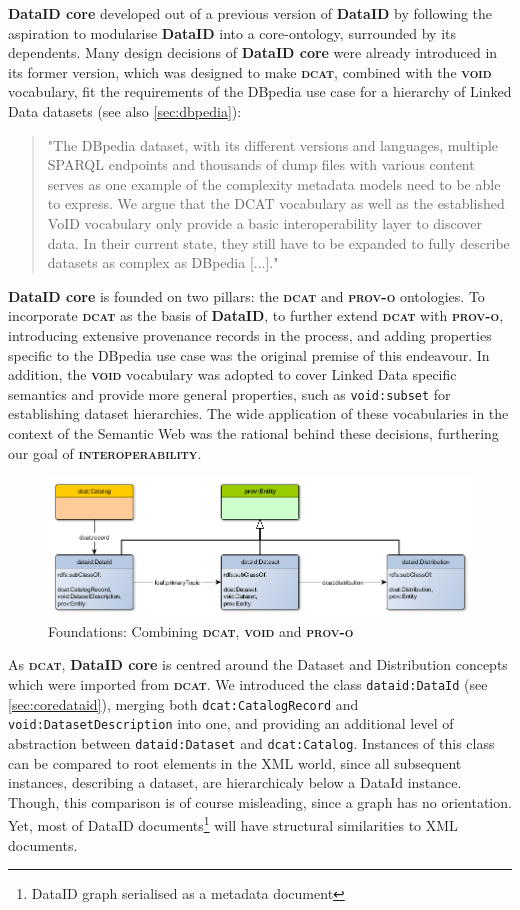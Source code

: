\documentclass[a4paper,english,twoside,BCOR1.5cm,headsepline,DIV12,appendixprefix,final,12pt]{scrbook}
\newcommand{\interoperability}{{\ttfamily\scshape\bfseries interoperability}\xspace}
\newcommand{\dataid}{{\ttfamily\bfseries DataID}\xspace}
\newcommand{\core}{{\ttfamily\bfseries DataID core}\xspace}
\newcommand{\prov}{{\scshape\bfseries prov-o}\xspace}
\newcommand{\void}{{\scshape\bfseries void}\xspace}
\newcommand{\dcat}{{\scshape\bfseries dcat}\xspace}
\newcommand{\prop}[1]{{{\texttt{#1}}}}
\begin{document}
\core developed out of a previous version of \dataid by following the aspiration to modularise \dataid into a core-ontology, surrounded by its dependents. Many design decisions of \core were already introduced in its former version, which was designed to make \dcat, combined with the \void vocabulary, fit the requirements of the DBpedia use case for a hierarchy of Linked Data datasets (see also \cref{sec:dbpedia}):

\begin{quote}
"The DBpedia dataset, with
its different versions and languages, multiple SPARQL endpoints
and thousands of dump files with various content
serves as one example of the complexity metadata models
need to be able to express. We argue that the DCAT vocabulary
as well as the established VoID vocabulary only
provide a basic interoperability layer to discover data. In
their current state, they still have to be expanded to fully
describe datasets as complex as DBpedia [...]." \cite{dataID2014} 
\end{quote}

\core is founded on two pillars: the \dcat and \prov ontologies. To incorporate \dcat as the basis of \dataid, to further extend \dcat with \prov, introducing extensive provenance records in the process, and adding properties specific to the DBpedia use case was the original premise of this endeavour. In addition, the \void vocabulary was adopted to cover Linked Data specific semantics and provide more general properties, such as  \prop{void:subset} for establishing dataset hierarchies. The wide application of these vocabularies in the context of the Semantic Web was the rational behind these decisions, furthering our goal of \interoperability. 

\begin{figure}[!htbp]
\centering
  \includegraphics[width=\textwidth]{images/FoundationalConcept.png}
  \caption{Foundations: Combining \dcat, \void and \prov}
  \label{fig:foundations}
\end{figure}

As \dcat, \core is centred around the Dataset and Distribution concepts which were imported from \dcat. We introduced the class \prop{dataid:DataId} (see \cref{sec:coredataid}), merging both \prop{dcat:CatalogRecord} and \prop{void:DatasetDescription} into one, and providing an additional level of abstraction between \prop{dataid:Dataset} and \prop{dcat:Catalog}. Instances of this class can be compared to root elements in the XML world, since all subsequent instances, describing a dataset, are hierarchicaly below a DataId instance. Though, this comparison is of course misleading, since a graph has no orientation. Yet, most of DataID documents\footnote{DataID graph serialised as a metadata document} will have structural similarities to XML documents.
\end{document}
